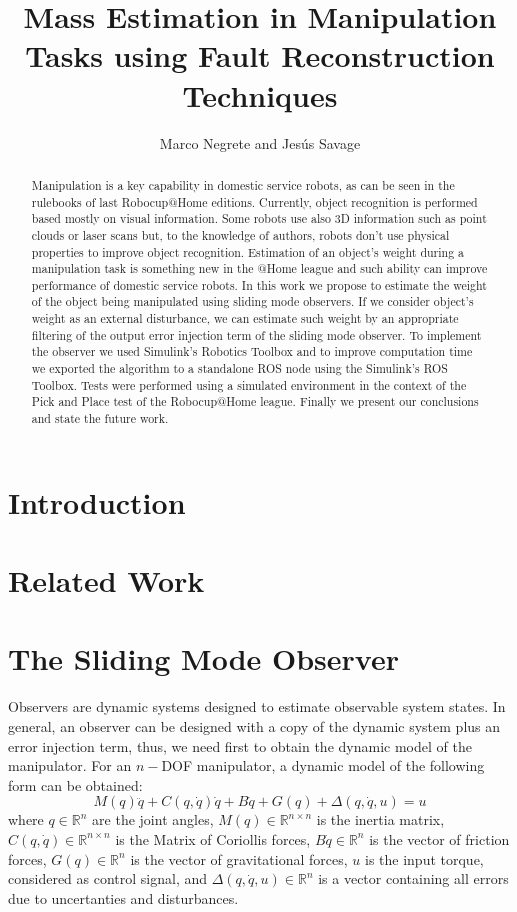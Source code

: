 \documentclass[a4paper, 10pt]{article}
\title{Mass Estimation in Manipulation Tasks using Fault Reconstruction Techniques}
\author{Marco Negrete and Jesús Savage}
\begin{document}
\maketitle
\begin{abstract}
  Manipulation is a key capability in domestic service robots, as can be seen in the rulebooks of last Robocup@Home editions. Currently, object recognition is performed based mostly on visual information. Some robots use also 3D information such as point clouds or laser scans but, to the knowledge of authors, robots don't use physical properties to improve object recognition. Estimation of an object's weight during a manipulation task is something new in the @Home league and such ability can improve performance of domestic service robots. In this work we propose to estimate the weight of the object being manipulated using sliding mode observers. If we consider object's weight as an external disturbance, we can estimate such weight by an appropriate filtering of the output error injection term of the sliding mode observer. To implement the observer we used Simulink's Robotics Toolbox and to improve computation time we exported the algorithm to a standalone ROS node using the Simulink's ROS Toolbox. Tests were performed using a simulated environment in the context of the Pick and Place test of the Robocup@Home league. Finally we present our conclusions and state the future work. 
\end{abstract}

\section{Introduction}

\section{Related Work}

\section{The Sliding Mode Observer}
Observers are dynamic systems designed to estimate observable system states. In general, an observer can be designed with a copy of the dynamic system plus an error injection term, thus, we need first to obtain the dynamic model of the manipulator. For an $n-$DOF manipulator, a dynamic model of the following form can be obtained:
\begin{equation}
    M(q)\ddot{q} + C(q, \dot{q})\dot{q} + B\dot{q} + G(q) + \Delta(q,\dot{q}, u) = u
    \label{eq:lagrangian}
\end{equation}
where $q\in \mathbb{R}^n$ are the joint angles, $M(q)\in \mathbb{R}^{n\times n}$ is the inertia matrix, $C(q,\dot{q})\in \mathbb{R}^{n\times n}$ is the Matrix of Coriollis forces, $B\dot{q}\in \mathbb{R}^n$ is the vector of friction forces, $G(q)\in\mathbb{R}^n$ is the vector of gravitational forces, $u$ is the input torque, considered as control signal, and $\Delta(q,\dot{q},u)\in\mathbb{R}^n$ is a vector containing all errors due to uncertanties and disturbances.
\end{document}
